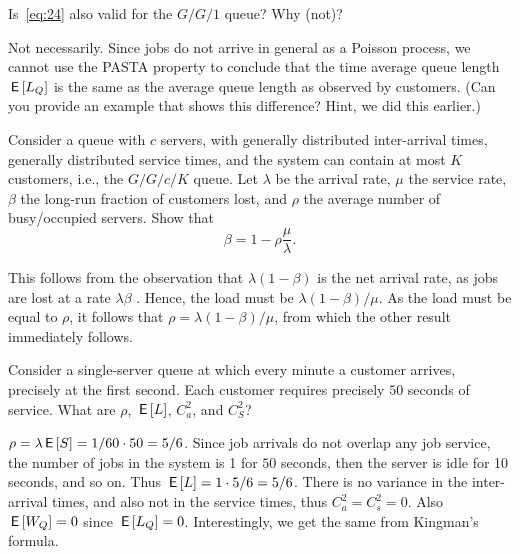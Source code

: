 \begin{extra}
  Is~\cref{eq:24} also valid for the $G/G/1$ queue? Why (not)?
\begin{solution}
    Not necessarily.
    Since jobs do not arrive in general as a Poisson process, we cannot use the PASTA property to conclude that the time average queue length $\,\mathsf{E}\left[L_Q\right]$ is the same as the average queue length as observed by customers.
    (Can you provide an example that shows this difference?
    Hint, we did this earlier.)
\end{solution}
\end{extra}

\begin{exercise}
  Consider a queue with $c$ servers, with generally distributed inter-arrival times, generally distributed service times, and the system can contain at most $K$ customers, i.e., the $G/G/c/K$ queue.
  Let $\lambda$ be the arrival rate, $\mu$ the service rate, $\beta$ the long-run fraction of customers lost, and $\rho$ the average number of busy/occupied servers.
  Show that
  \begin{equation*}
    \beta = 1 - \rho\frac{\mu}{\lambda}.
  \end{equation*}
\begin{solution}
  This follows from the observation that $\lambda(1-\beta)$ is the net
  arrival rate, as jobs are lost at a rate $\lambda\beta$ . Hence, the
  load must be $\lambda(1-\beta)/\mu$. As the load must be equal to
  $\rho$, it follows that $\rho = \lambda(1-\beta)/\mu$, from which the
  other result immediately follows.
\end{solution}
\end{exercise}

\begin{extra}\label{ex:77}
  Consider a single-server queue at which every minute a customer arrives, precisely at the first second.
  Each customer requires precisely $50$ seconds of service.
  What are $\rho$, $\,\mathsf{E}\left[L\right]$, $C_a^2$, and $C_S^2$?
\begin{solution}
    $\rho = \lambda \,\mathsf{E}\left[S\right] = 1/60 \cdot 50 = 5/6$.
    Since job arrivals do not overlap any job service, the number of jobs in the system is 1 for $50$ seconds, then the server is idle for 10 seconds, and so on.
    Thus $\,\mathsf{E}\left[L\right] = 1\cdot5/6 = 5/6$.
    There is no variance in the inter-arrival times, and also not in the service times, thus $C_a^2 = C_s^2 = 0$.
    Also $\,\mathsf{E}\left[W_Q\right]=0$ since $\,\mathsf{E}\left[L_Q\right]=0$.
    Interestingly, we get the same from Kingman's formula.
\end{solution}
\end{extra}

